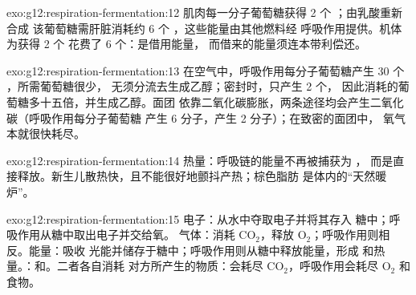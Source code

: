 \begin{solution}{exo:g12:respiration-fermentation:12}
肌肉每一分子葡萄糖获得 2 个 ；由乳酸重新合成
该葡萄糖需肝脏消耗约 6 个 ，这些能量由其他燃料经
呼吸作用提供。机体为获得 2 个  花费了 6 个：是借用能量，
而借来的能量须连本带利偿还。
\end{solution}

\begin{solution}{exo:g12:respiration-fermentation:13}
在空气中，呼吸作用每分子葡萄糖产生 30 个 ，所需葡萄糖很少，
无须分流去生成乙醇；密封时，只产生 2 个，
因此消耗的葡萄糖多十五倍，并生成乙醇。面团
依靠二氧化碳膨胀，两条途径均会产生二氧化碳（呼吸作用每分子葡萄糖
产生 6 分子，产生 2 分子）；在致密的面团中，
氧气本就很快耗尽。
\end{solution}

\begin{solution}{exo:g12:respiration-fermentation:14}
热量：呼吸链的能量不再被捕获为 ，
而是直接释放。新生儿散热快，且不能很好地颤抖产热；棕色脂肪
是体内的“天然暖炉”。
\end{solution}

\begin{solution}{exo:g12:respiration-fermentation:15}
电子：从水中夺取电子并将其存入
糖中；呼吸作用从糖中取出电子并交给氧。
气体：消耗 $\mathrm{CO_2}$，释放
$\mathrm{O_2}$；呼吸作用则相反。能量：吸收
光能并储存于糖中；呼吸作用则从糖中释放能量，形成
 和热量。：和。二者各自消耗
对方所产生的物质：会耗尽
$\mathrm{CO_2}$，呼吸作用会耗尽 $\mathrm{O_2}$ 和食物。
\end{solution}

